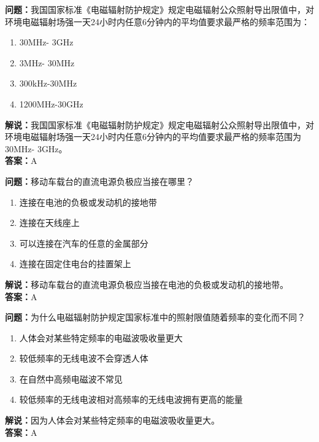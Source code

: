\textbf{问题：}我国国家标准《电磁辐射防护规定》规定电磁辐射公众照射导出限值中，对环境电磁辐射场强一天24小时内任意6分钟内的平均值要求最严格的频率范围为：
\begin{enumerate}[label=\Alph*), leftmargin=1cm]
	\item 30MHz- 3GHz
	\item 3MHz- 30MHz
	\item 300kHz-30MHz
	\item 1200MHz-30GHz
\end{enumerate}
\textbf{解说：}我国国家标准《电磁辐射防护规定》规定电磁辐射公众照射导出限值中，对环境电磁辐射场强一天24小时内任意6分钟内的平均值要求最严格的频率范围为30MHz- 3GHz。\\
\textbf{答案：}A

\textbf{问题：}移动车载台的直流电源负极应当接在哪里？
\begin{enumerate}[label=\Alph*), leftmargin=1cm]
	\item 连接在电池的负极或发动机的接地带
	\item 连接在天线座上
	\item 可以连接在汽车的任意的金属部分
	\item 连接在固定住电台的挂置架上
\end{enumerate}
\textbf{解说：}移动车载台的直流电源负极应当接在电池的负极或发动机的接地带。\\
\textbf{答案：}A

\textbf{问题：}为什么电磁辐射防护规定国家标准中的照射限值随着频率的变化而不同？
\begin{enumerate}[label=\Alph*), leftmargin=1cm]
	\item 人体会对某些特定频率的电磁波吸收量更大
	\item 较低频率的无线电波不会穿透人体
	\item 在自然中高频电磁波不常见
	\item 较低频率的无线电波相对高频率的无线电波拥有更高的能量
\end{enumerate}
\textbf{解说：}因为人体会对某些特定频率的电磁波吸收量更大。\\
\textbf{答案：}A